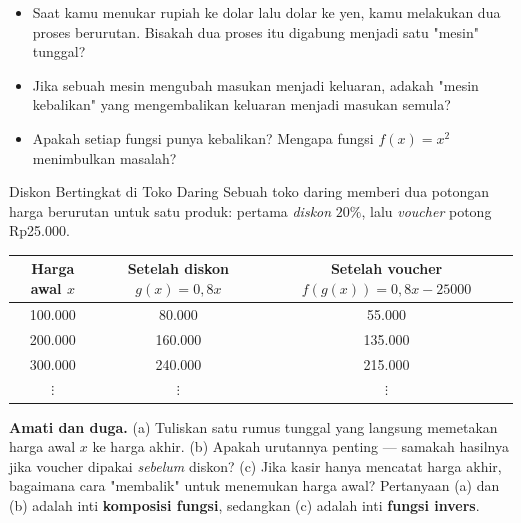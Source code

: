 \documentclass[11pt,a4paper]{report}
\theoremstyle{gaya}
\begin{document}
\begin{pemantik}
\begin{itemize}[leftmargin=*,topsep=2pt]
  \item Saat kamu menukar rupiah ke dolar lalu dolar ke yen, kamu melakukan dua proses berurutan. Bisakah dua proses itu digabung menjadi satu "mesin" tunggal?
  \item Jika sebuah mesin mengubah masukan menjadi keluaran, adakah "mesin kebalikan" yang mengembalikan keluaran menjadi masukan semula?
  \item Apakah setiap fungsi punya kebalikan? Mengapa fungsi $f(x)=x^2$ menimbulkan masalah?
\end{itemize}
\end{pemantik}

\begin{studikasus}{Diskon Bertingkat di Toko Daring}
Sebuah toko daring memberi dua potongan harga berurutan untuk satu produk: pertama \emph{diskon} $20\%$, lalu \emph{voucher} potong Rp25.000.
\begin{center}
\begin{tabular}{c|c|c}
\toprule
Harga awal $x$ & Setelah diskon $g(x)=0{,}8x$ & Setelah voucher $f(g(x))=0{,}8x-25000$ \\
\midrule
100.000 & 80.000 & 55.000 \\
200.000 & 160.000 & 135.000 \\
300.000 & 240.000 & 215.000 \\
$\vdots$ & $\vdots$ & $\vdots$ \\
\bottomrule
\end{tabular}
\end{center}
\textbf{Amati dan duga.} (a) Tuliskan satu rumus tunggal yang langsung memetakan harga awal $x$ ke harga akhir. (b) Apakah urutannya penting --- samakah hasilnya jika voucher dipakai \emph{sebelum} diskon? (c) Jika kasir hanya mencatat harga akhir, bagaimana cara "membalik" untuk menemukan harga awal? Pertanyaan (a) dan (b) adalah inti \textbf{komposisi fungsi}, sedangkan (c) adalah inti \textbf{fungsi invers}.
\end{studikasus}
\end{document}
